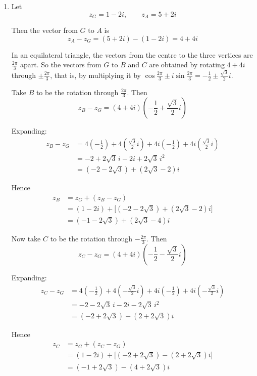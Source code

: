\documentclass[leqno]{article}
\begin{document}
\begin{enumerate}[
  label=\textbf{\arabic*.},
  leftmargin=*,
  topsep=0pt,
  partopsep=0pt,
  parsep=0pt
]
\vspace*{10pt}

\begin{djsSolution}
\begin{enumerate}[label=\textbf{(\alph*)}]
  \item Let
  \[
  z_G=1-2i,\qquad z_A=5+2i
  \]

  Then the vector from \(G\) to \(A\) is
  \[
  z_A-z_G=(5+2i)-(1-2i)=4+4i
  \]

  In an equilateral triangle, the vectors from the centre to the three vertices are \(\frac{2\pi}{3}\) apart. So the vectors from \(G\) to \(B\) and \(C\) are obtained by rotating \(4+4i\) through \(\pm\frac{2\pi}{3}\), that is, by multiplying it by \(\cos\frac{2\pi}{3}\pm i\sin\frac{2\pi}{3}=-\frac12\pm\frac{\sqrt3}{2}i\).

  Take \(B\) to be the rotation through \(\frac{2\pi}{3}\). Then
  \[
  z_B-z_G=(4+4i)\left(-\frac12+\frac{\sqrt3}{2}i\right)
  \]

  Expanding:
  \begin{align*}
  z_B-z_G
  &=4\left(-\frac12\right)+4\left(\frac{\sqrt3}{2}i\right)+4i\left(-\frac12\right)+4i\left(\frac{\sqrt3}{2}i\right) \\
  &=-2+2\sqrt3\,i-2i+2\sqrt3\,i^2 \\
  &=(-2-2\sqrt3)+(2\sqrt3-2)i
  \end{align*}

  Hence
  \begin{align*}
  z_B&=z_G+(z_B-z_G) \\
  &=(1-2i)+\bigl[(-2-2\sqrt3)+(2\sqrt3-2)i\bigr] \\
  &=(-1-2\sqrt3)+(2\sqrt3-4)i
  \end{align*}

  Now take \(C\) to be the rotation through \(-\frac{2\pi}{3}\). Then
  \[
  z_C-z_G=(4+4i)\left(-\frac12-\frac{\sqrt3}{2}i\right)
  \]

  Expanding:
  \begin{align*}
  z_C-z_G
  &=4\left(-\frac12\right)+4\left(-\frac{\sqrt3}{2}i\right)+4i\left(-\frac12\right)+4i\left(-\frac{\sqrt3}{2}i\right) \\
  &=-2-2\sqrt3\,i-2i-2\sqrt3\,i^2 \\
  &=(-2+2\sqrt3)-(2+2\sqrt3)i
  \end{align*}

  Hence
  \begin{align*}
  z_C&=z_G+(z_C-z_G) \\
  &=(1-2i)+\bigl[(-2+2\sqrt3)-(2+2\sqrt3)i\bigr] \\
  &=(-1+2\sqrt3)-(4+2\sqrt3)i
  \end{align*}


\end{enumerate}
\end{djsSolution}
\end{enumerate}
\end{document}
